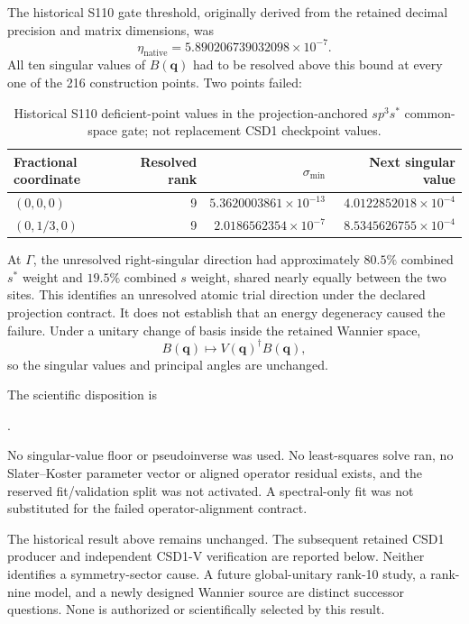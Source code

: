 The historical S110 gate threshold, originally derived from the retained
decimal precision and matrix dimensions, was
\begin{equation}
  \eta_{\mathrm{native}}
  =5.890206739032098\times10^{-7}.
\end{equation}
All ten singular values of $B(\mathbf q)$ had to be resolved above this bound at
every one of the 216 construction points. Two points failed:

\begin{table}[htbp]
  \centering
  \small
  \caption{Historical S110 deficient-point values in the projection-anchored
  $sp^3s^{\ast}$ common-space gate; not replacement CSD1 checkpoint values.}
  \label{tab:preliminary-si-sk-rank}
  \begin{tabular}{lrrr}
    \toprule
    Fractional coordinate & Resolved rank & $\sigma_{\min}$ & Next singular value \\
    \midrule
    $(0,0,0)$ & 9 & $5.3620003861\times10^{-13}$ & $4.0122852018\times10^{-4}$ \\
    $(0,1/3,0)$ & 9 & $2.0186562354\times10^{-7}$ & $8.5345626755\times10^{-4}$ \\
    \bottomrule
  \end{tabular}
\end{table}

At $\Gamma$, the unresolved right-singular direction had approximately
$80.5\%$ combined $s^{\ast}$ weight and $19.5\%$ combined $s$ weight, shared
nearly equally between the two sites. This identifies an unresolved atomic
trial direction under the declared projection contract. It does not establish
that an energy degeneracy caused the failure. Under a unitary change of basis
inside the retained Wannier space,
\begin{equation}
  B(\mathbf q)\longmapsto V(\mathbf q)^{\dagger}B(\mathbf q),
\end{equation}
so the singular values and principal angles are unchanged.

The scientific disposition is
\begin{center}
  .
\end{center}
No singular-value floor or pseudoinverse was used. No least-squares solve ran,
no Slater--Koster parameter vector or aligned operator residual exists, and the
reserved fit/validation split was not activated. A spectral-only fit was not
substituted for the failed operator-alignment contract.

The historical result above remains unchanged. The subsequent retained CSD1
producer and independent CSD1-V verification are reported below. Neither
identifies a symmetry-sector cause. A future global-unitary rank-10 study, a
rank-nine model, and a newly designed Wannier source are distinct successor
questions. None is authorized or scientifically selected by this result.

